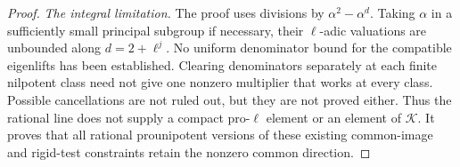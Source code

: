 \begin{proof}
\emph{The integral limitation.}
The proof uses divisions by
$\alpha^2-\alpha^d$.  Taking $\alpha$ in a sufficiently
small principal subgroup if necessary, their
$\ell$-adic valuations are unbounded along
$d=2+\ell^j$.
No uniform denominator bound for the compatible
eigenlifts has been established.  Clearing denominators
separately at each finite nilpotent class need not give
one nonzero multiplier that works at every class.
Possible cancellations are not ruled out, but they
are not proved either.  Thus the rational line does
not supply a compact pro-$\ell$ element or an element
of $\mathcal K$.  It proves that all rational
prounipotent versions of these existing common-image
and rigid-test constraints retain the nonzero common
direction.
\end{proof}

